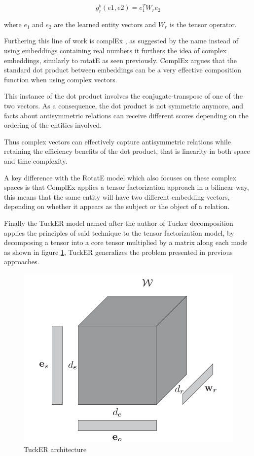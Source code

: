 \begin{equation}
    \label{eq:distmult_scoring}
    g^b_r (e1, e2) = e_1^T W_r e_2
\end{equation}

where $e_1$ and $e_2$ are the learned entity vectors and $W_r$ is the tensor operator. 

Furthering this line of work is complEx \cite{}, as suggested by the name instead of using embeddings containing real numbers it furthers the idea of complex embeddings, similarly to rotatE as seen previously. ComplEx argues that the standard dot product between embeddings can be a very effective composition function when using complex vectors.

This instance of the dot product involves the conjugate-transpose of one of the two vectors. As a consequence, the dot product is not symmetric anymore, and facts about antisymmetric relations can receive different scores depending on the ordering of the entities involved.

Thus complex vectors can effectively capture antisymmetric relations while retaining the efficiency benefits of the dot product, that is linearity in both space and time complexity.

A key difference with the RotatE model which also focuses on these complex spaces is that ComplEx applies a tensor factorization approach in a bilinear way, this means that the same entity will have two different embedding vectors, depending on whether it appears as the subject or the object of a relation.

Finally the TuckER \cite{} model named after the author of Tucker decomposition \cite{} applies the principles of said technique to the tensor factorization model, by decomposing a tensor into a core tensor multiplied by a matrix along each mode as shown in figure \ref{fig:emb-tucker}, TuckER generalizes the problem presented in previous approaches.

\begin{figure}[!ht]
    \centering
    \includegraphics[width=.45\textwidth]{fig/embeddings/TuckER.png}
    \caption{TuckER architecture}
    \label{fig:emb-tucker}
\end{figure}

